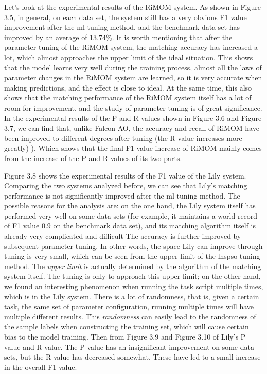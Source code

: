 \documentclass[twoside]{article}
\begin{document}
\begin{multicols}{2}
Let's look at the experimental results of the RiMOM system. 
As shown in Figure 3.5, in general, on each data set, the system still has a very obvious F1 value improvement after the ml tuning method, and the benchmark data set has improved by an average of 13.74\%. 
It is worth mentioning that after the parameter tuning of the RiMOM system, the matching accuracy has increased a lot, which almost approaches the upper limit of the ideal situation. 
This shows that the model learns very well during the training process, almost all the laws of parameter changes in the RiMOM system are learned, so it is very accurate when making predictions, and the effect is close to ideal. 
At the same time, this also shows that the matching performance of the RiMOM system itself has a lot of room for improvement, and the study of parameter tuning is of great significance. 
In the experimental results of the P and R values shown in Figure 3.6 and Figure 3.7, we can find that, unlike Falcon-AO, the accuracy and recall of RiMOM have been improved to different degrees after tuning (the R value increases more greatly) ), Which shows that the final F1 value increase of RiMOM mainly comes from the increase of the P and R values of its two parts.

Figure 3.8 shows the experimental results of the F1 value of the Lily system. 
Comparing the two systems analyzed before, we can see that Lily's matching performance is not significantly improved after the ml tuning method. 
The possible reasons for the analysis are: on the one hand, the Lily system itself has performed very well on some data sets (for example, it maintains a world record of F1 value 0.9 on the benchmark data set), and its matching algorithm itself is already very complicated and difficult The accuracy is further improved by subsequent parameter tuning. 
In other words, the space Lily can improve through tuning is very small, which can be seen from the upper limit of the lhspso tuning method. 
The {\it upper limit} is actually determined by the algorithm of the matching system itself. The tuning is only to approach this upper limit; on the other hand, we found an interesting phenomenon when running the task script multiple times, which is in the Lily system. There is a lot of randomness, that is, given a certain task, the same set of parameter configuration, running multiple times will have multiple different results. 
This {\it randomness} can easily lead to the randomness of the sample labels when constructing the training set, which will cause certain bias to the model training. 
Then from Figure 3.9 and Figure 3.10 of Lily's P value and R value. The P value has an insignificant improvement on some data sets, but the R value has decreased somewhat. These have led to a small increase in the overall F1 value.


\end{multicols}
\end{document}

